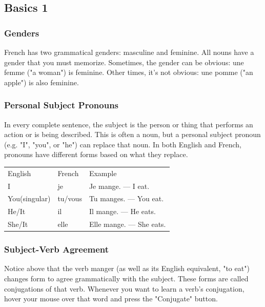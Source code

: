 \subsection{Basics 1}

\subsubsection{Genders}

French has two grammatical genders: masculine and feminine. All nouns have a gender that you must memorize. Sometimes, the gender can be obvious: une femme ("a woman") is feminine. Other times, it's not obvious: une pomme ("an apple") is also feminine.

\subsubsection{Personal Subject Pronouns}

In every complete sentence, the subject is the person or thing that performs an action or is being described. This is often a noun, but a personal subject pronoun (e.g. "I", "you", or "he") can replace that noun. In both English and French, pronouns have different forms based on what they replace.

\begin{tabular}{lll}
English       & French  & Example                 \\
I             & je      & Je mange. — I eat.      \\
You(singular) & tu/vous & Tu manges. — You eat.   \\
He/It         & il      & Il mange. — He eats.    \\
She/It        & elle    & Elle mange. — She eats.
\end{tabular}

\subsubsection{Subject-Verb Agreement}

Notice above that the verb manger (as well as its English equivalent, "to eat") changes form to agree grammatically with the subject. These forms are called conjugations of that verb. Whenever you want to learn a verb's conjugation, hover your mouse over that word and press the "Conjugate" button. 

